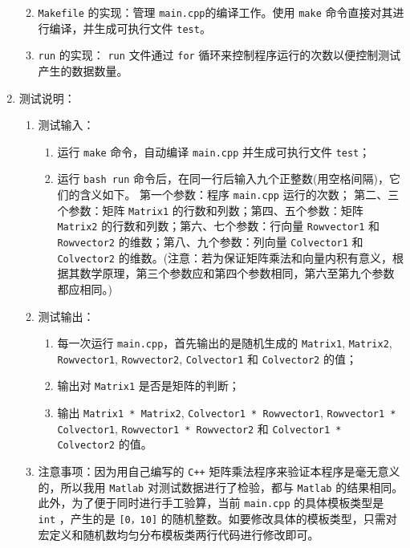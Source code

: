 \documentclass[a4paper,12pt]{article}
\begin{document}
\begin{enumerate}
\begin{enumerate}
\begin{enumerate}
    \end{enumerate}
    \item \verb|Makefile| 的实现：管理 \verb|main.cpp|的编译工作。使用 \verb|make| 命令直接对其进行编译，并生成可执行文件 \verb|test|。
    \item \verb|run| 的实现： \verb|run| 文件通过 \verb|for| 循环来控制程序运行的次数以便控制测试产生的数据数量。
\end{enumerate}
\item 测试说明：
\begin{enumerate}
    \item 测试输入：
    \begin{enumerate}
        \item 运行 \verb|make| 命令，自动编译 \verb|main.cpp| 并生成可执行文件 \verb|test|；
        \item 运行 \verb|bash run| 命令后，{\hei 在同一行后输入九个正整数(用空格间隔)，它们的含义如下。} 第一个参数：程序 \verb|main.cpp| 运行的次数； 第二、三个参数：矩阵 \verb|Matrix1| 的行数和列数；第四、五个参数：矩阵 \verb|Matrix2| 的行数和列数；第六、七个参数：行向量 \verb|Rowvector1| 和 \verb|Rowvector2| 的维数；第八、九个参数：列向量 \verb|Colvector1| 和 \verb|Colvector2| 的维数。{\hei (注意：若为保证矩阵乘法和向量内积有意义，根据其数学原理，第三个参数应和第四个参数相同，第六至第九个参数都应相同。)}
    \end{enumerate}
    \item 测试输出：
    \begin{enumerate}
        \item 每一次运行 \verb|main.cpp|，首先输出的是随机生成的 \verb|Matrix1|, \verb|Matrix2|, \verb|Rowvector1|, \verb|Rowvector2|, \verb|Colvector1| 和 \verb|Colvector2| 的值；
        \item 输出对 \verb|Matrix1| 是否是矩阵的判断；
        \item 输出 \verb|Matrix1 * Matrix2|, \verb|Colvector1 * Rowvector1|, \verb|Rowvector1 * Colvector1|, \verb|Rowvector1 * Rowvector2| 和 \verb|Colvector1 * Colvector2| 的值。
    \end{enumerate}
    \item 注意事项：因为用自己编写的 \verb|C++| 矩阵乘法程序来验证本程序是毫无意义的，所以我用 \verb|Matlab| 对测试数据进行了检验，都与 \verb|Matlab| 的结果相同。此外，为了便于同时进行手工验算，当前 \verb|main.cpp| 的具体模板类型是 \verb|int| ，产生的是 \verb|[0，10]| 的随机整数。如要修改具体的模板类型，只需对宏定义和随机数均匀分布模板类两行代码进行修改即可。

\end{enumerate}
\end{enumerate}



\end{document}

